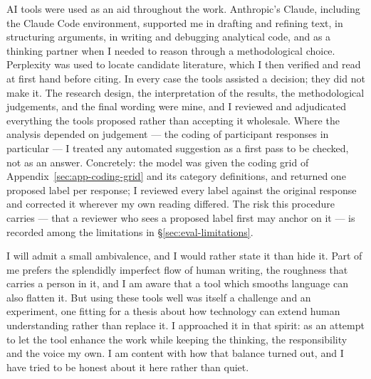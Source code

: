 AI tools were used as an aid throughout the work. Anthropic's Claude, including the Claude Code environment, supported me in drafting and refining text, in structuring arguments, in writing and debugging analytical code, and as a thinking partner when I needed to reason through a methodological choice. Perplexity was used to locate candidate literature, which I then verified and read at first hand before citing. In every case the tools assisted a decision; they did not make it. The research design, the interpretation of the results, the methodological judgements, and the final wording were mine, and I reviewed and adjudicated everything the tools proposed rather than accepting it wholesale. Where the analysis depended on judgement --- the coding of participant responses in particular --- I treated any automated suggestion as a first pass to be checked, not as an answer. Concretely: the model was given the coding grid of Appendix~\ref{sec:app-coding-grid} and its category definitions, and returned one proposed label per response; I reviewed every label against the original response and corrected it wherever my own reading differed. The risk this procedure carries --- that a reviewer who sees a proposed label first may anchor on it --- is recorded among the limitations in \S\ref{sec:eval-limitations}.

I will admit a small ambivalence, and I would rather state it than hide it. Part of me prefers the splendidly imperfect flow of human writing, the roughness that carries a person in it, and I am aware that a tool which smooths language can also flatten it. But using these tools well was itself a challenge and an experiment, one fitting for a thesis about how technology can extend human understanding rather than replace it. I approached it in that spirit: as an attempt to let the tool enhance the work while keeping the thinking, the responsibility and the voice my own. I am content with how that balance turned out, and I have tried to be honest about it here rather than quiet.
